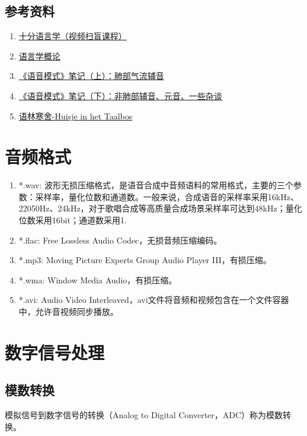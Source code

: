 \documentclass[cn,10pt,math=newtx,citestyle=gb7714-2015,bibstyle=gb7714-2015]{elegantbook}
\begin{document}
\subsection{参考资料}

\begin{enumerate}
  \item \href{https://space.bilibili.com/363660379}{十分语言学（视频扫盲课程）}
  \item \href{http://media.openonline.com.cn/media_file/rm/huashi0703/yuyanxgl/mulu.htm}{语言学概论}
  \item \href{https://zhuanlan.zhihu.com/p/470501423}{《语音模式》笔记（上）：肺部气流辅音}
  \item \href{https://zhuanlan.zhihu.com/p/471036291}{《语音模式》笔记（下）：非肺部辅音、元音、一些杂谈}
  \item \href{https://www.zhihu.com/column/yulinhanshe}{语林寒舍-Huisje in het Taalbos}
\end{enumerate}

\section{音频格式}
\begin{enumerate}
  \item *.wav: 波形无损压缩格式，是语音合成中音频语料的常用格式，主要的三个参数：采样率，量化位数和通道数。一般来说，合成语音的采样率采用16kHz、22050Hz、24kHz，对于歌唱合成等高质量合成场景采样率可达到48kHz；量化位数采用16bit；通道数采用1.
  \item *.flac: Free Lossless Audio Codec，无损音频压缩编码。
  \item *.mp3: Moving Picture Experts Group Audio Player III，有损压缩。
  \item *.wma: Window Media Audio，有损压缩。
  \item *.avi: Audio Video Interleaved，avi文件将音频和视频包含在一个文件容器中，允许音视频同步播放。
\end{enumerate}

\section{数字信号处理}

\subsection{模数转换}

模拟信号到数字信号的转换（Analog to Digital Converter，ADC）称为模数转换。
\end{document}
